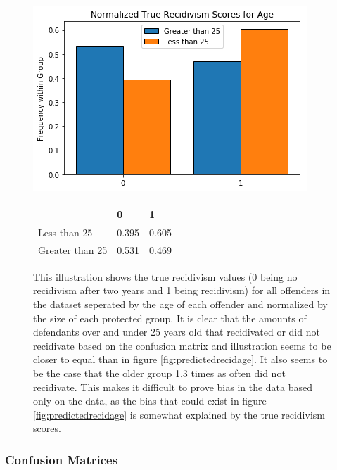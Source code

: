 \documentclass[11pt, fleqn, titlepage]{article}
\begin{document}
		\begin{figure}[H]
		\centering
		\includegraphics[width=0.5\linewidth]{imgs/true_normalized_age}
		\begin{table}[H]
			\centering
			\begin{tabular}{|l|l|l|}
				\hline
				& 0   & 1  \\ \hline
				Less than 25        & 0.395 & 0.605  \\ \hline
				Greater than 25     & 0.531 & 0.469  \\ \hline
			\end{tabular}
		\end{table}
		\caption{This illustration shows the true recidivism values (0 being no recidivism after two years and 1 being recidivism) for all offenders in the dataset seperated by the age of each offender and normalized by the size of each protected group. It is clear that the amounts of defendants over and under 25 years old that recidivated or did not recidivate based on the confusion matrix and illustration seems to be closer to equal than in figure \ref{fig:predictedrecidage}. It also seems to be the case that the older group 1.3 times as often did not recidivate. This makes it difficult to prove bias in the data based only on the data, as the bias that could exist in figure \ref{fig:predictedrecidage} is somewhat explained by the true recidivism scores.}
		\label{fig:truerecid}
	\end{figure}
	
	\subsubsection{Confusion Matrices}
	
\end{document}
